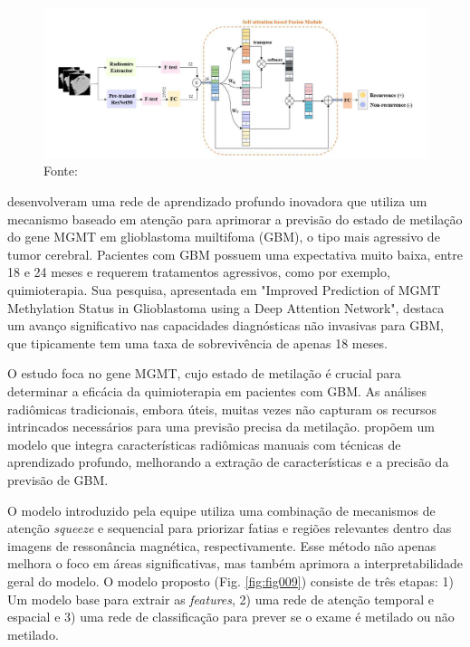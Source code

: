 \begin{figure}[htbp]
    \centering
    \includegraphics[width=1\textwidth]{figures/fig008.png}
    \caption{Fonte: \cite{aiSelfAttentionBasedFusion2023}}
    \label{fig:fig008}
\end{figure}

\cite{iranmehrImprovedPredictionMGMT2022} desenvolveram uma rede de aprendizado profundo inovadora que utiliza um mecanismo baseado em atenção para aprimorar a previsão do estado de metilação do gene MGMT em glioblastoma muiltifoma (GBM), o tipo mais agressivo de tumor cerebral. Pacientes com GBM possuem uma expectativa muito baixa, entre 18 e 24 meses e requerem tratamentos agressivos, como por exemplo, quimioterapia. Sua pesquisa, apresentada em "Improved Prediction of MGMT Methylation Status in Glioblastoma using a Deep Attention Network", destaca um avanço significativo nas capacidades diagnósticas não invasivas para GBM, que tipicamente tem uma taxa de sobrevivência de apenas 18 meses.

O estudo foca no gene MGMT, cujo estado de metilação é crucial para determinar a eficácia da quimioterapia em pacientes com GBM. As análises radiômicas tradicionais, embora úteis, muitas vezes não capturam os recursos intrincados necessários para uma previsão precisa da metilação. \citeauthor{iranmehrImprovedPredictionMGMT2022} propõem um modelo que integra características radiômicas manuais com técnicas de aprendizado profundo, melhorando a extração de características e a precisão da previsão de GBM.

O modelo introduzido pela equipe utiliza uma combinação de mecanismos de atenção \textit{squeeze} e sequencial para priorizar fatias e regiões relevantes dentro das imagens de ressonância magnética, respectivamente. Esse método não apenas melhora o foco em áreas significativas, mas também aprimora a interpretabilidade geral do modelo. O modelo proposto (Fig. \ref{fig:fig009}) consiste de três etapas: 1) Um modelo base para extrair as \textit{features}, 2) uma rede de atenção temporal e espacial e 3) uma rede de classificação para prever se o exame é metilado ou não metilado. 

